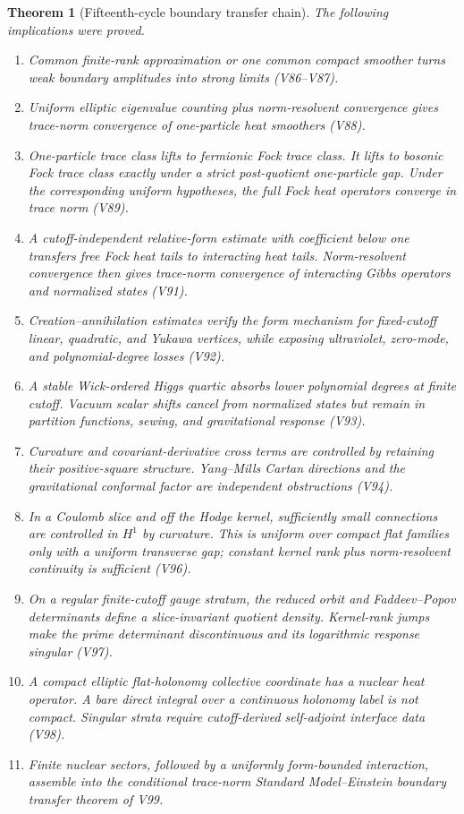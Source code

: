 \documentclass[11pt]{article}
\newtheorem{theorem}{Theorem}[section]
\theoremstyle{remark}
\begin{document}
\begin{theorem}[Fifteenth-cycle boundary transfer chain]
\label{thm:v15v100-chain}
The following implications were proved.
\begin{enumerate}
\item Common finite-rank approximation or one common compact
      smoother turns weak boundary amplitudes into strong limits
      (V86--V87).
\item Uniform elliptic eigenvalue counting plus norm-resolvent
      convergence gives trace-norm convergence of one-particle heat
      smoothers (V88).
\item One-particle trace class lifts to fermionic Fock trace class.
      It lifts to bosonic Fock trace class exactly under a strict
      post-quotient one-particle gap.  Under the corresponding
      uniform hypotheses, the full Fock heat operators converge in
      trace norm (V89).
\item A cutoff-independent relative-form estimate with coefficient
      below one transfers free Fock heat tails to interacting heat
      tails.  Norm-resolvent convergence then gives trace-norm
      convergence of interacting Gibbs operators and normalized
      states (V91).
\item Creation--annihilation estimates verify the form mechanism for
      fixed-cutoff linear, quadratic, and Yukawa vertices, while
      exposing ultraviolet, zero-mode, and polynomial-degree losses
      (V92).
\item A stable Wick-ordered Higgs quartic absorbs lower polynomial
      degrees at finite cutoff.  Vacuum scalar shifts cancel from
      normalized states but remain in partition functions, sewing,
      and gravitational response (V93).
\item Curvature and covariant-derivative cross terms are controlled
      by retaining their positive-square structure.  Yang--Mills
      Cartan directions and the gravitational conformal factor are
      independent obstructions (V94).
\item In a Coulomb slice and off the Hodge kernel, sufficiently
      small connections are controlled in \(H^1\) by curvature.
      This is uniform over compact flat families only with a
      uniform transverse gap; constant kernel rank plus
      norm-resolvent continuity is sufficient (V96).
\item On a regular finite-cutoff gauge stratum, the reduced orbit
      and Faddeev--Popov determinants define a slice-invariant
      quotient density.  Kernel-rank jumps make the prime
      determinant discontinuous and its logarithmic response
      singular (V97).
\item A compact elliptic flat-holonomy collective coordinate has a
      nuclear heat operator.  A bare direct integral over a
      continuous holonomy label is not compact.  Singular strata
      require cutoff-derived self-adjoint interface data (V98).
\item Finite nuclear sectors, followed by a uniformly form-bounded
      interaction, assemble into the conditional trace-norm
      Standard Model--Einstein boundary transfer theorem of V99.
\end{enumerate}
\end{theorem}
\end{document}
